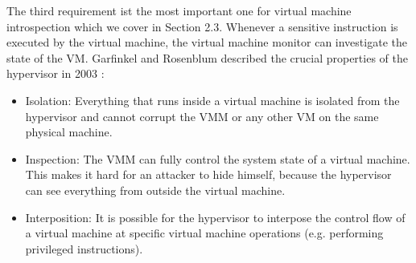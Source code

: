 \documentclass[sigconf]{acmart}
\begin{document}
The third requirement ist the most important one for virtual machine introspection which we cover in Section 2.3. Whenever a sensitive instruction is executed by the virtual machine, the virtual machine monitor can investigate the state of the VM.
\newline
\newline
Garfinkel and Rosenblum described the crucial properties of the hypervisor in 2003 \cite{garfinkel2003virtual}:
\newline
\begin{itemize}
	\item Isolation: Everything that runs inside a virtual machine is isolated from the hypervisor and cannot corrupt the VMM or any other VM on the same physical machine.
	\newline 
	\item Inspection: The VMM can fully control the system state of a virtual machine. This makes it hard for an attacker to hide himself, because the hypervisor can see everything from outside the virtual machine.
	\newline
	\item Interposition: It is possible for the hypervisor to interpose the control flow of a virtual machine at specific virtual machine operations (e.g. performing privileged instructions).
	\newline
\end{itemize}
\end{document}
